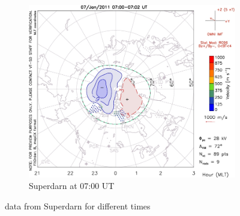 \documentclass[10pt,a4paper]{article}
\begin{document}
\begin{figure}
\begin{subfigure}{0.3\textwidth}
	\includegraphics[width=\textwidth]{Superdarn14.jpg}
	\caption{ Superdarn at 07:00 UT \label{Super_07}}
\end{subfigure}
\caption{data from Superdarn for different times}
\label{Super_overview}
\end{figure}
\end{document}

